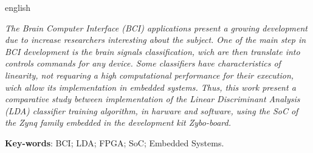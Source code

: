\begin{resumo}[Abstract]
 \begin{otherlanguage*}{english}

 \textit{The Brain Computer Interface (BCI) applications present a growing development due to increase researchers interesting about the subject. One of the main step in BCI development is the brain signals classification, wich are then translate into controls commands for any device. Some classifiers have characteristics of linearity, not requaring a high computational performance for their execution, wich allow its implementation in embedded systems. Thus, this work present a comparative study between implementation of the Linear Discriminant Analysis (LDA) classifier training algorithm, in harware and software, using the SoC of the Zynq family embedded in the development kit Zybo-board.}

   \vspace{\onelineskip}
 
   \noindent 
   \textbf{Key-words}: BCI; LDA; FPGA; SoC; Embedded Systems.
 \end{otherlanguage*}
\end{resumo}
